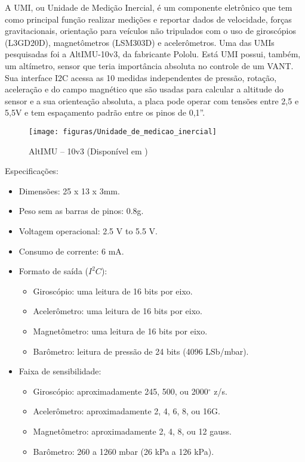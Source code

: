 
A UMI, ou Unidade de Medição Inercial, é um componente eletrônico que tem como principal função realizar medições e reportar dados de velocidade, forças gravitacionais, orientação para veículos não tripulados com o uso de giroscópios  (L3GD20D), magnetômetros (LSM303D) e acelerômetros. Uma das UMIs pesquisadas foi a AltIMU-10v3, da fabricante Pololu. Está UMI possui, também, um altímetro, sensor que teria importância absoluta no controle de um VANT. Sua interface I2C acessa as 10 medidas independentes de pressão, rotação, aceleração e do campo magnético que são usadas para calcular a altitude do sensor e a sua orienteação absoluta, a placa pode operar com tensões entre 2,5 e 5,5V e tem espaçamento padrão entre os pinos de 0,1”. \cite{umi2014}

\begin{figure}[H]
\centering\texttt{[image: figuras/Unidade\_de\_medicao\_inercial]}
\caption{AltIMU – 10v3 (Disponível em \cite{amazon2014})}
\end{figure}

Especificações:

\begin{itemize}
	\item Dimensões: 25 x 13 x 3mm.
	\item Peso sem as barras de pinos: 0.8g.
	\item Voltagem operacional: 2.5 V to 5.5 V.
	\item Consumo de corrente: 6 mA.
	\item Formato de saída ($I^{2}C$):
	\begin{itemize}
		\item Giroscópio: uma leitura de 16 bits por eixo.
		\item Acelerômetro: uma leitura de 16 bits por eixo.
		\item Magnetômetro: uma leitura de 16 bits por eixo.
		\item Barômetro: leitura de pressão de 24 bits (4096 LSb/mbar).
	\end{itemize}
	\item Faixa de sensibilidade:
	\begin{itemize}
		\item Giroscópio: aproximadamente 245, 500, ou 2000$^\circ$ z/s.
		\item Acelerômetro: aproximadamente 2, 4, 6, 8, ou 16G.
		\item Magnetômetro: aproximadamente 2, 4, 8, ou 12 gauss.
		\item Barômetro: 260 a 1260 mbar (26 kPa a 126 kPa).
	\end{itemize}
\end{itemize}

